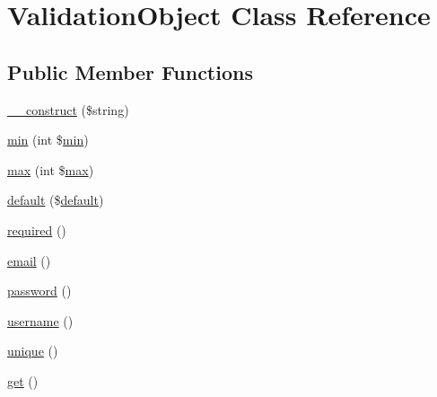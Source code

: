 \hypertarget{classcommon_1_1user_1_1_validation_object}{\section{\-Validation\-Object \-Class \-Reference}
\label{classcommon_1_1user_1_1_validation_object}
}
\subsection*{\-Public \-Member \-Functions}
\begin{DoxyCompactItemize}
\item 
\hyperlink{classcommon_1_1user_1_1_validation_object_a86d355bfc3694145c81bf7ba65d3cded}{\-\_\-\-\_\-construct} (\$string)
\item 
\hyperlink{classcommon_1_1user_1_1_validation_object_ac484db1921d1bf332bf2057c5d76f00b}{min} (int \$\hyperlink{classcommon_1_1user_1_1_validation_object_ac484db1921d1bf332bf2057c5d76f00b}{min})
\item 
\hyperlink{classcommon_1_1user_1_1_validation_object_a828368d4b97de602a22ef361ddc77fbb}{max} (int \$\hyperlink{classcommon_1_1user_1_1_validation_object_a828368d4b97de602a22ef361ddc77fbb}{max})
\item 
\hyperlink{classcommon_1_1user_1_1_validation_object_aa6f71964368c3c77a22ab04d33916f8c}{default} (\$\hyperlink{classcommon_1_1user_1_1_validation_object_aa6f71964368c3c77a22ab04d33916f8c}{default})
\item 
\hyperlink{classcommon_1_1user_1_1_validation_object_abd2999eed85fa7437ba20d06fc517623}{required} ()
\item 
\hyperlink{classcommon_1_1user_1_1_validation_object_a0814d3be8538f244db1f0f63a9588a30}{email} ()
\item 
\hyperlink{classcommon_1_1user_1_1_validation_object_af692b38313fcd34758e3269d74da796f}{password} ()
\item 
\hyperlink{classcommon_1_1user_1_1_validation_object_a7475524fbb2e38dd6c9f7a6661b0bb81}{username} ()
\item 
\hyperlink{classcommon_1_1user_1_1_validation_object_a4687cd60c977d2d7171628bc42c81129}{unique} ()
\item 
\hyperlink{classcommon_1_1user_1_1_validation_object_ac33ee765f5ad9f134540bac393721cfe}{get} ()
\end{DoxyCompactItemize}
